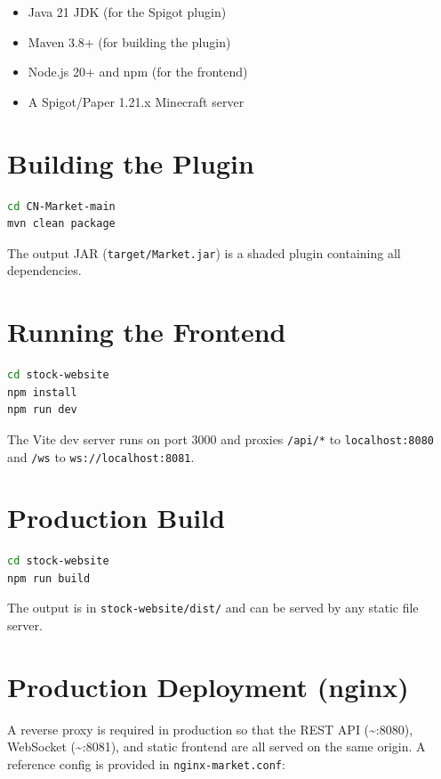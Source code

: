 \documentclass[12pt,a4paper]{report}
\begin{document}
\begin{itemize}
\item Java 21 JDK (for the Spigot plugin)
\item Maven 3.8+ (for building the plugin)
\item Node.js 20+ and npm (for the frontend)
\item A Spigot/Paper 1.21.x Minecraft server
\end{itemize}

\section{Building the Plugin}

\begin{lstlisting}[language=sh, caption=Build plugin]
cd CN-Market-main
mvn clean package
\end{lstlisting}

The output JAR (\texttt{target/Market.jar}) is a shaded plugin containing
all dependencies.

\section{Running the Frontend}

\begin{lstlisting}[language=sh, caption=Start frontend dev server]
cd stock-website
npm install
npm run dev
\end{lstlisting}

The Vite dev server runs on port 3000 and proxies \texttt{/api/*} to
\texttt{localhost:8080} and \texttt{/ws} to \texttt{ws://localhost:8081}.

\section{Production Build}

\begin{lstlisting}[language=sh, caption=Production frontend build]
cd stock-website
npm run build
\end{lstlisting}

The output is in \texttt{stock-website/dist/} and can be served by any
static file server.

\section{Production Deployment (nginx)}

A reverse proxy is required in production so that the REST API
(\textasciitilde:8080), WebSocket (\textasciitilde:8081), and static frontend
are all served on the same origin. A reference config is provided in
\texttt{nginx-market.conf}:
\end{document}
